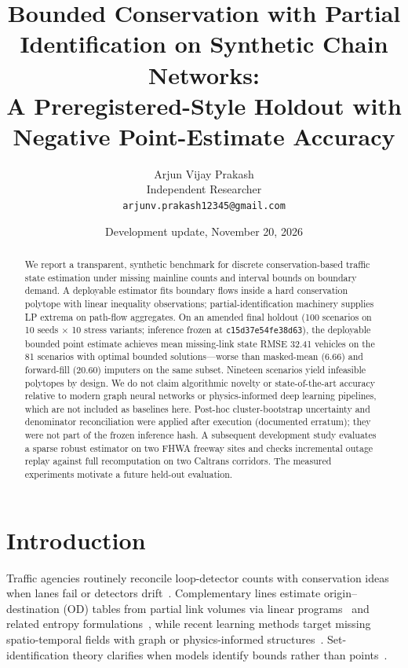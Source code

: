 \documentclass{article}
\title{Bounded Conservation with Partial Identification on Synthetic Chain Networks:\\
  A Preregistered-Style Holdout with Negative Point-Estimate Accuracy}
\author{Arjun Vijay Prakash \\
  Independent Researcher \\
  \texttt{arjunv.prakash12345@gmail.com}}
\date{Development update, November 20, 2026}
\begin{document}
\maketitle

\begin{abstract}
We report a transparent, synthetic benchmark for discrete conservation-based traffic state estimation
under missing mainline counts and interval bounds on boundary demand.
A deployable estimator fits boundary flows inside a hard conservation polytope with linear inequality
observations; partial-identification machinery supplies LP extrema on path-flow aggregates.
On an amended final holdout (100 scenarios on 10 seeds $\times$ 10 stress variants; inference frozen at
\texttt{c15d37e54fe38d63}), the deployable bounded point estimate achieves mean missing-link state RMSE
32.41 vehicles on the 81 scenarios with optimal bounded solutions---worse than masked-mean (6.66) and
forward-fill (20.60) imputers on the same subset.
Nineteen scenarios yield infeasible polytopes by design.
We do not claim algorithmic novelty or state-of-the-art accuracy relative to modern graph neural
networks or physics-informed deep learning pipelines, which are not included as baselines here.
Post-hoc cluster-bootstrap uncertainty and denominator reconciliation were applied after execution
(documented erratum); they were not part of the frozen inference hash.
A subsequent development study evaluates a sparse robust estimator on two FHWA freeway sites and
checks incremental outage replay against full recomputation on two Caltrans corridors.
The measured experiments motivate a future held-out evaluation.
\end{abstract}


\section{Introduction}
Traffic agencies routinely reconcile loop-detector counts with conservation ideas when lanes fail or
detectors drift~\cite{caceres2019reconciliation}.
Complementary lines estimate origin--destination (OD) tables from partial link volumes via linear
programs~\cite{sherali1994odlp,sherali2003partialvolumes} and related entropy formulations~\cite{xie2011entropy},
while recent learning methods target missing spatio-temporal fields with graph or physics-informed
structures~\cite{pu2020gmnn,shi2021pidl}.
Set-identification theory clarifies when models identify bounds rather than points~\cite{molinari2020sharp,galichon2011sharp}.
\end{document}
